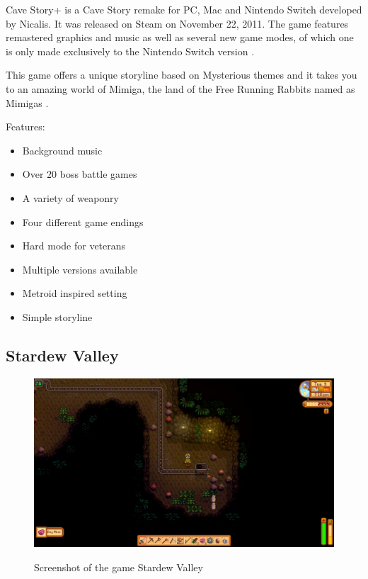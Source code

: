 \documentclass[12p]{article}
\begin{document}
Cave Story+ is a Cave Story remake for PC, Mac and Nintendo Switch developed by Nicalis. It was released on Steam on November 22, 2011. The game features remastered graphics and music as well as several new game modes, of which one is only made exclusively to the Nintendo Switch version \cite{CaveStoryPlusWiki}.

This game offers a unique storyline based on Mysterious themes and it takes you to an amazing world of Mimiga, the land of the Free Running Rabbits named as Mimigas \cite{CaveStoryPlusMoreGamesLike}.

Features:

\begin{itemize}
    \item Background music
    \item Over 20 boss battle games
    \item A variety of weaponry
    \item Four different game endings
    \item Hard mode for veterans
    \item Multiple versions available
    \item Metroid inspired setting
    \item Simple storyline
\end{itemize}


\subsection{Stardew Valley}

\begin{figure}[h]
    \center
    \includegraphics[width=1\textwidth]{StateOfTheArtScreenshots/stardew_valley}
    \label{StateOfTheArt_Screenshots_StardewValley}
    \caption{Screenshot of the game Stardew Valley \cite{StardewValleyScreenshot}}
\end{figure}
\end{document}
